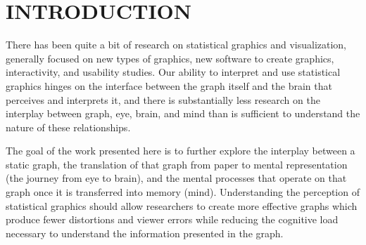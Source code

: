\documentclass[11pt]{isuthesis}\usepackage[]{graphicx}\usepackage[]{color}
\begin{document}

% 
\tableofcontents
{} \cleardoublepage {}
{}
\listoftables
\cleardoublepage {} {}
\listoffigures
% 
% 
\newpage
{}

\setcounter{chapter}{-1}
\chapter{INTRODUCTION}
There has been quite a bit of research on statistical graphics and visualization, generally focused on new types of graphics, new software to create graphics, interactivity, and usability studies. Our ability to interpret and use statistical graphics hinges on the interface between the graph itself and the brain that perceives and interprets it, and there is substantially less research on the interplay between graph, eye, brain, and mind than is sufficient to understand the nature of these relationships. 

The goal of the work presented here is to further explore the interplay between a static graph, the translation of that graph from paper to mental representation (the journey from eye to brain), and the mental processes that operate on that graph once it is transferred into memory (mind). Understanding the perception of statistical graphics should allow researchers to create more effective graphs which produce fewer distortions and viewer errors while reducing the cognitive load necessary to understand the information presented in the graph. 
\end{document}
